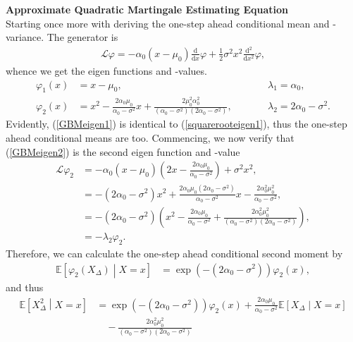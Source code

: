 \noindent \textbf{Approximate Quadratic Martingale Estimating Equation}\\
\noindent Starting once more with deriving the one-step ahead conditional mean and - variance. The generator is
\begin{align}
    \mathcal{L}\varphi = -\alpha_0\left(x - \mu_0\right)\frac{\mathrm{d}}{\mathrm{d}x}\varphi + \frac{1}{2}\sigma^2 x^2 \frac{\mathrm{d}^2}{\mathrm{d}x^2}\varphi,
\end{align}
whence we get the eigen functions and -values.
\begin{align}
    \varphi_1(x) &= x - \mu_0, \qquad &&\lambda_1 = \alpha_0, \label{GBMeigen1} \\
    \varphi_2(x) &= x^2 - \frac{2\alpha_0\mu_0}{\alpha_0 - \sigma^2}x + \frac{2\mu_0^2\alpha_0^2}{\left(\alpha_0 - \sigma^2\right)\left(2\alpha_0 - \sigma^2\right)}, \qquad &&\lambda_2 = 2\alpha_0 - \sigma^2 \label{GBMeigen2}.
\end{align}
Evidently, (\ref{GBMeigen1}) is identical to (\ref{squarerooteigen1}), thus the one-step ahead conditional means are too. Commencing, we now verify that (\ref{GBMeigen2}) is the second eigen function and -value
\begin{align}
    \mathcal{L}\varphi_2 & = -\alpha_0\left(x-\mu_0\right)\left(2x - \frac{2\alpha_0\mu_0}{\alpha_0-\sigma^2}\right) + \sigma^2x^2,\\
    &=-\left(2\alpha_0 - \sigma^2\right)x^2 + \frac{2\alpha_0\mu_0\left(2\alpha_0-\sigma^2\right)}{\alpha_0 - \sigma^2}x - \frac{2\alpha_0^2\mu_0^2}{\alpha_0 - \sigma^2}, \\
    &= -\left(2\alpha_0 -\sigma^2\right)\left(x^2 - \frac{2\alpha_0\mu_0}{\alpha_0-\sigma^2} + \frac{2\alpha_0^2\mu_0^2}{\left(\alpha_0-\sigma^2\right)\left(2\alpha_0-\sigma^2\right)}\right),\\
    &= - \lambda_2 \varphi_2.
\end{align}
Therefore, we can calculate the one-step ahead conditional second moment by
\begin{align}
    \mathbb{E}\left[\varphi_2(X_\Delta)\middle|X = x\right] &= \exp\left(-\left(2\alpha_0 - \sigma^2\right)\right)\varphi_2(x),
\end{align}
and thus
\begin{align}
    \mathbb{E}\left[X_\Delta^2 \middle| X = x\right] &= \exp\left(-\left(2\alpha_0 - \sigma^2\right)\right)\varphi_2(x) + \frac{2\alpha_0\mu_0}{\alpha_0-\sigma^2} \mathbb{E}\left[X_\Delta\middle|X=x\right] \nonumber \\
    &\quad - \frac{2\alpha_0^2\mu_0^2}{\left(\alpha_0-\sigma^2\right)\left(2\alpha_0-\sigma^2\right)} \label{GBM_secondmoment}
\end{align}
